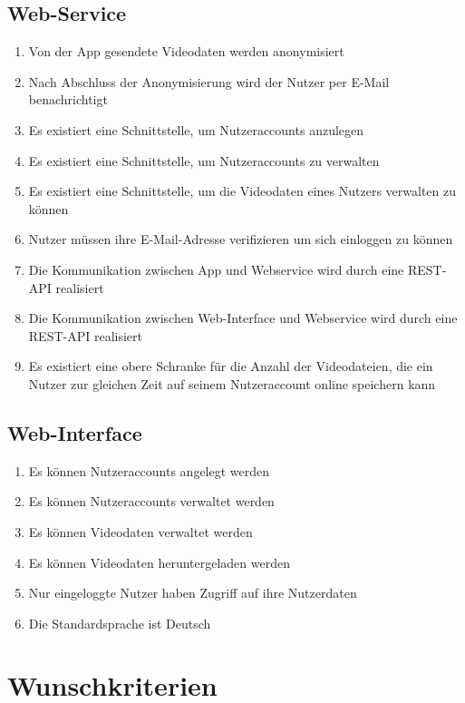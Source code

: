 \subsection{Web-Service}
	\begin{enumerate}[\bfseries{/PK}2010/]
	\item Von der App gesendete Videodaten werden anonymisiert
	\item Nach Abschluss der Anonymisierung wird der Nutzer per E-Mail benachrichtigt
	\item Es existiert eine Schnittstelle, um Nutzeraccounts anzulegen
	\item Es existiert eine Schnittstelle, um Nutzeraccounts zu verwalten
	\item Es existiert eine Schnittstelle, um die Videodaten eines Nutzers verwalten zu können
	\item Nutzer müssen ihre E-Mail-Adresse verifizieren um sich einloggen zu können
	\item Die Kommunikation zwischen App und Webservice wird durch eine REST-API realisiert
	\item Die Kommunikation zwischen Web-Interface und Webservice wird durch eine REST-API realisiert
	\item Es existiert eine obere Schranke für die Anzahl der Videodateien, die ein Nutzer zur gleichen Zeit auf seinem Nutzeraccount online speichern kann
	\end{enumerate}
\subsection{Web-Interface}
	\begin{enumerate}[\bfseries{/PK}3010/]
	\item Es können Nutzeraccounts angelegt werden
	\item Es können Nutzeraccounts verwaltet werden
	\item Es können Videodaten verwaltet werden
	\item Es können Videodaten heruntergeladen werden
	\item Nur eingeloggte Nutzer haben Zugriff auf ihre Nutzerdaten
	\item Die Standardsprache ist Deutsch
	\end{enumerate}

\section{Wunschkriterien}
